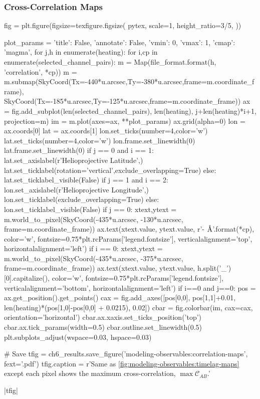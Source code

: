 \subsubsection{Cross-Correlation Maps}\label{sec:modeling-observables:cross_correlation_maps}

\begin{pycode}
fig = plt.figure(figsize=texfigure.figsize(
    pytex,
    scale=1,
    height_ratio=3/5,
))

plot_params = {'title': False, 'annotate': False, 'vmin': 0, 'vmax': 1, 'cmap': 'magma',}
for j,h in enumerate(heating):
    for i,cp in enumerate(selected_channel_pairs):
        m = Map(file_format.format(h, 'correlation', *cp))
        m = m.submap(SkyCoord(Tx=-440*u.arcsec,Ty=-380*u.arcsec,frame=m.coordinate_frame),
                     SkyCoord(Tx=-185*u.arcsec,Ty=-125*u.arcsec,frame=m.coordinate_frame))
        ax = fig.add_subplot(len(selected_channel_pairs), len(heating), j+len(heating)*i+1,
                             projection=m)
        im = m.plot(axes=ax, **plot_params)
        ax.grid(alpha=0)
        lon = ax.coords[0]
        lat = ax.coords[1]
        lon.set_ticks(number=4,color='w')
        lat.set_ticks(number=4,color='w')
        lon.frame.set_linewidth(0)
        lat.frame.set_linewidth(0)
        if j == 0 and i == 1:
            lat.set_axislabel(r'Helioprojective Latitude',)
            lat.set_ticklabel(rotation='vertical',exclude_overlapping=True)
        else:
            lat.set_ticklabel_visible(False)
        if j == 1 and i == 2:
            lon.set_axislabel(r'Helioprojective Longitude',)
            lon.set_ticklabel(exclude_overlapping=True)
        else:
            lon.set_ticklabel_visible(False)
        if j == 0:
            xtext,ytext = m.world_to_pixel(SkyCoord(-435*u.arcsec, -130*u.arcsec, frame=m.coordinate_frame))
            ax.text(xtext.value, ytext.value, r'{}-{} $\si{{\angstrom}}$'.format(*cp),
                    color='w', fontsize=0.75*plt.rcParams['legend.fontsize'],
                    verticalalignment='top', horizontalalignment='left')
        if i == 0:
            xtext,ytext = m.world_to_pixel(SkyCoord(-435*u.arcsec, -375*u.arcsec, frame=m.coordinate_frame))
            ax.text(xtext.value, ytext.value, h.split('_')[0].capitalize(),
                    color='w', fontsize=0.75*plt.rcParams['legend.fontsize'],
                    verticalalignment='bottom', horizontalalignment='left')
        if i==0 and j==0:
            pos = ax.get_position().get_points()
            cax = fig.add_axes([pos[0,0], pos[1,1]+0.01, len(heating)*(pos[1,0]-pos[0,0] + 0.0215), 0.02])
            cbar = fig.colorbar(im, cax=cax, orientation='horizontal')
            cbar.ax.xaxis.set_ticks_position('top')
            cbar.ax.tick_params(width=0.5)
            cbar.outline.set_linewidth(0.5)
plt.subplots_adjust(wspace=0.03, hspace=0.03)

# Save
tfig = ch6_results.save_figure('modeling-observables:correlation-maps', fext='.pdf')
tfig.caption = r'Same as \autoref{fig:modeling-observables:timelag-maps} except each pixel shows the maximum cross-correlation, $\max\mathcal{C}_{AB}$.'
\end{pycode}
|tfig|

